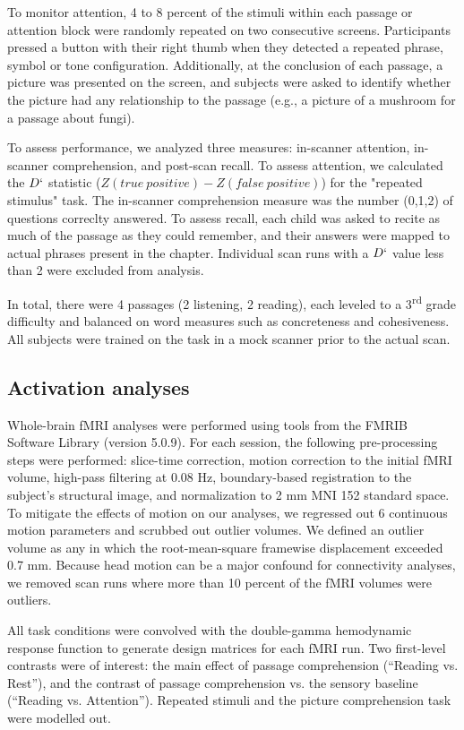 To monitor attention, 4 to 8 percent of the stimuli within each passage or attention block were randomly repeated on two consecutive screens.  Participants pressed a button with their right thumb when they detected a repeated phrase, symbol or tone configuration. Additionally, at the conclusion of each passage, a picture was presented on the screen, and subjects were asked to identify whether the picture had any relationship to the passage (e.g., a picture of a mushroom for a passage about fungi). 

To assess performance, we analyzed three measures: in-scanner attention, in-scanner comprehension, and post-scan recall. To assess attention, we calculated the $D`$ statistic ($Z(true\ positive) - Z(false\ positive)$) for the "repeated stimulus" task. The in-scanner comprehension measure was the number (0,1,2) of questions correclty answered. To assess recall, each child was asked to recite as much of the passage as they could remember, and their answers were mapped to actual phrases present in the chapter. Individual scan runs with a $D`$ value less than 2 were excluded from analysis.

In total, there were 4 passages (2 listening, 2 reading), each leveled to a 3\textsuperscript{rd} grade difficulty and balanced on word measures such as concreteness and cohesiveness.  All subjects were trained on the task in a mock scanner prior to the actual scan. 


\subsection{Activation analyses}

Whole-brain fMRI analyses were performed using tools from the FMRIB Software Library (version 5.0.9). For each session, the following pre-processing steps were performed:  slice-time correction, motion correction to the initial fMRI volume, high-pass filtering at 0.08 Hz, boundary-based registration to the subject's structural image, and normalization to 2 mm MNI 152 standard space. To mitigate the effects of motion on our analyses, we regressed out 6 continuous motion parameters and scrubbed out outlier volumes. We defined an outlier volume as any in which the root-mean-square framewise displacement exceeded 0.7 mm. Because head motion can be a major confound for connectivity analyses, we removed scan runs where more than 10 percent of the fMRI volumes were outliers.

All task conditions were convolved with the double-gamma hemodynamic response function to generate design matrices for each fMRI run. Two first-level contrasts were of interest: the main effect of passage comprehension (``Reading vs. Rest''), and the contrast of passage comprehension vs. the sensory baseline (``Reading vs. Attention''). Repeated stimuli and the picture comprehension task were modelled out.

